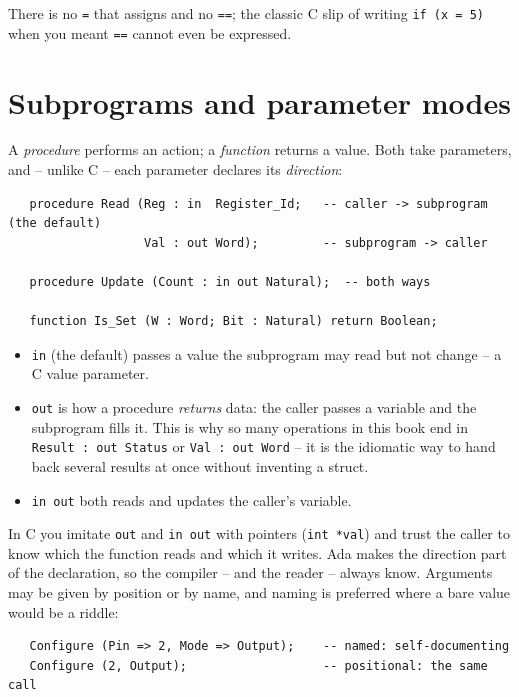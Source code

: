 There is no \texttt{=} that assigns and no \texttt{==}; the classic C slip of
writing \texttt{if (x = 5)} when you meant \texttt{==} cannot even be expressed.

\section{Subprograms and parameter modes}

A \emph{procedure} performs an action; a \emph{function} returns a value. Both take
parameters, and -- unlike C -- each parameter declares its \emph{direction}:

\begin{lstlisting}
   procedure Read (Reg : in  Register_Id;   -- caller -> subprogram (the default)
                   Val : out Word);         -- subprogram -> caller

   procedure Update (Count : in out Natural);  -- both ways

   function Is_Set (W : Word; Bit : Natural) return Boolean;
\end{lstlisting}

\begin{itemize}
  \item \texttt{in} (the default) passes a value the subprogram may read but not
        change -- a C value parameter.
  \item \texttt{out} is how a procedure \emph{returns} data: the caller passes a
        variable and the subprogram fills it. This is why so many operations in this
        book end in \texttt{Result : out Status} or \texttt{Val : out Word} -- it is
        the idiomatic way to hand back several results at once without inventing a
        struct.
  \item \texttt{in out} both reads and updates the caller's variable.
\end{itemize}

In C you imitate \texttt{out} and \texttt{in out} with pointers (\texttt{int *val})
and trust the caller to know which the function reads and which it writes. Ada makes
the direction part of the declaration, so the compiler -- and the reader -- always
know. Arguments may be given by position or by name, and naming is preferred where
a bare value would be a riddle:

\begin{lstlisting}
   Configure (Pin => 2, Mode => Output);    -- named: self-documenting
   Configure (2, Output);                   -- positional: the same call
\end{lstlisting}

